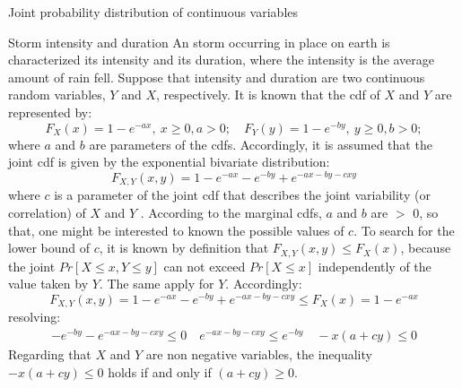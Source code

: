 \documentclass[8pt]{beamer}
\renewcommand{\emph}[1]{\textcolor{myorange}{#1}}
\begin{document}
\begin{frame}{Joint probability distribution of continuous variables}

    \begin{exampleblock}{Storm intensity and duration}
        An storm occurring in place on earth is characterized its \emph{intensity} and its \emph{duration}, where the intensity is the average amount of rain fell. Suppose that intensity and duration are two continuous random variables, $Y$ and $X$, respectively. It is known that the \emph{cdf} of $X$ and $Y$ are represented by:
        \[
            F_X (x) = 1 - e^{-ax},\ x \geq 0, a >0; \quad F_Y (y) = 1 - e^{-by},\ y \geq 0, b >0; 
        \]
        where $a$ and $b$ are parameters of the \emph{cdf}s. Accordingly, it is assumed that the joint \emph{cdf} is given by the exponential bivariate distribution:
        \[
            F_{X,Y} (x,y) = 1 - e^{-ax} - e^{-by}+e^{-ax-by-cxy}
        \]
        where $c$ is a parameter of the joint \emph{cdf} that describes the joint variability (or correlation) of $X$ and $Y$ . According to the marginal \emph{cdf}s, $a$ and $b$ are $>$ 0, so that, one might be interested to known the possible values of $c$. To search for the lower bound of $c$, it is known by definition that $F_{X,Y} (x,y) \leq F_X (x)$, because the joint $Pr[X\leq x, Y\leq y]$ can not exceed $Pr[X\leq x]$ independently of the value taken by $Y$. The same apply for $Y$. Accordingly:
        \vspace{-5pt}
        \[
            F_{X,Y} (x,y) = 1 - e^{-ax} - e^{-by}+e^{-ax-by-cxy} \leq F_X (x) = 1 - e^{-ax}
        \]
        resolving:
        \vspace{-5pt}
        \begin{align*}
            -e^{-by}-e^{-ax-by-cxy} \leq 0 \quad e^{-ax-by-cxy} \leq e^{-by} \quad -x(a+cy) \leq 0
        \end{align*}
        Regarding that $X$ and $Y$ are non negative variables, the inequality $-x(a +cy)\leq 0$ holds if and only if $(a+cy)\geq 0$. 

    \end{exampleblock}
\end{frame}
\end{document}
